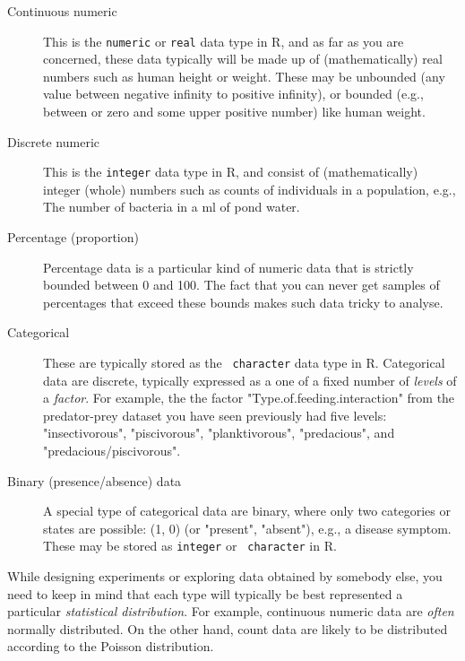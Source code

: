 \begin{description}

		\item[Continuous numeric] This is the {\tt  numeric} or {\tt real} 
		data type in R, and as far as you are concerned, these data 
		typically will be made up of (mathematically) real numbers such as 
		human height or weight. These may be unbounded (any value between 
		negative infinity to positive infinity), or bounded (e.g., between  
		or zero and some upper positive number) like human weight.
    
    \item[Discrete numeric] This is the {\tt  integer} data type in R, 
    and consist of (mathematically) integer (whole) numbers such as 
    counts of individuals in a population, e.g., The number of bacteria 
    in a ml of pond water. 
    
		\item[Percentage (proportion)] Percentage data is a particular kind 
		of numeric data that is strictly bounded between 0 and 100. The 
		fact that you can never get samples of percentages that exceed 
		these bounds makes such data tricky to analyse.
    
    \item [Categorical] These are typically stored as the {\tt  
		 character} data type in R. Categorical data are discrete, 
		 typically expressed as a one of a fixed number of {\it levels} of a 
		 {\it factor}. For example, the the factor "Type.of.feeding.interaction" 
		 from the predator-prey dataset you have seen previously had five 
		 levels: "insectivorous", "piscivorous", "planktivorous", 
		 "predacious", and "predacious/piscivorous".
      
     \item [Binary (presence/absence) data] A special type of 
     categorical data are binary, where only two categories or states 
     are possible: (1, 0) (or "present", "absent"), e.g., a disease 
     symptom. These may be stored as {\tt  integer} or {\tt  
     character} in R.
\end{description} 

While designing experiments or exploring data obtained by somebody 
else, you need to keep in mind that each type will typically be best 
represented a particular {\it statistical distribution}. For example, 
continuous numeric data are {\it often} normally distributed. On the 
other hand, count data are likely to be distributed according to the 
Poisson distribution.

